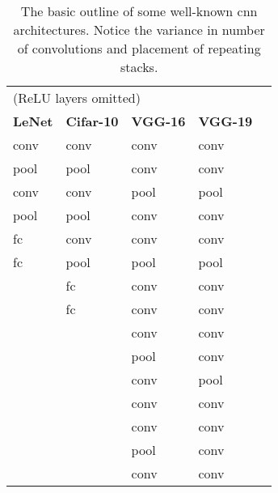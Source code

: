 \begin{table}[]
\centering
\caption[Some well-known cnn architectures]{The basic outline of some well-known cnn architectures. Notice the variance in number of convolutions and placement of repeating stacks.}
\label{tbl:cnns}
\begin{tabular}{|l|l|l|l|l}
\cline{1-4}
\multicolumn{4}{|l|}{(ReLU layers omitted)} &  \\ \cline{1-4}
\textbf{LeNet}   & \textbf{Cifar-10}      	& \textbf{VGG-16}         & \textbf{VGG-19}         &  \\ \cline{1-4}
conv             & conv     				& conv                    & conv                    &  \\ \cline{1-4}
pool             & pool     				& conv                    & conv                    &  \\ \cline{1-4}
conv             & conv     				& pool                    & pool                    &  \\ \cline{1-4}
pool             & pool  				    & conv                    & conv                    &  \\ \cline{1-4}
fc               & conv   				    & conv                    & conv                    &  \\ \cline{1-4}
fc               & pool     				& pool                    & pool                    &  \\ \cline{1-4}
                 & fc     					& conv                    & conv                    &  \\ \cline{1-4}
                 & fc      					& conv                    & conv                    &  \\ \cline{1-4}
                &       						& conv                    & conv                    &  \\ \cline{1-4}
                &       						& pool                    & conv                    &  \\ \cline{1-4}
                &      						& conv                    & pool                    &  \\ \cline{1-4}
                &       						& conv                    & conv                    &  \\ \cline{1-4}
                &       						& conv                    & conv                    &  \\ \cline{1-4}
                &      						& pool                    & conv                    &  \\ \cline{1-4}
                &       						& conv                    & conv                    &  \\ \cline{1-4}

\end{tabular}
\end{table}
